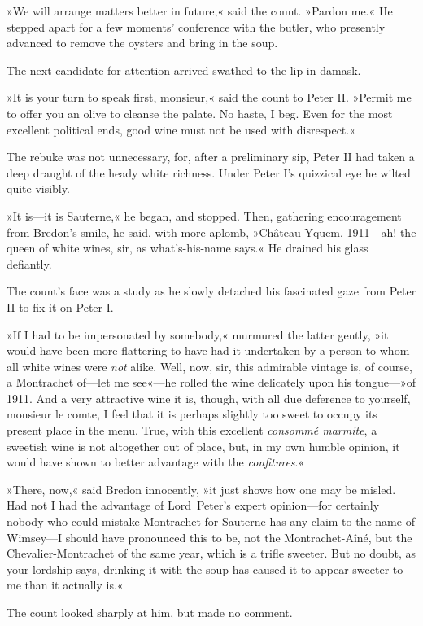 »We will arrange matters better in future,« said the count. »Pardon me.« He stepped apart for a few moments' conference with the butler, who presently advanced to remove the oysters and bring in the soup.

The next candidate for attention arrived swathed to the lip in damask.

»It is your turn to speak first, monsieur,« said the count to Peter II. »Permit me to offer you an olive to cleanse the palate. No haste, I beg. Even for the most excellent political ends, good wine must not be used with disrespect.«

The rebuke was not unnecessary, for, after a preliminary sip, Peter II had taken a deep draught of the heady white richness. Under Peter I's quizzical eye he wilted quite visibly.

»It is—it is Sauterne,« he began, and stopped. Then, gathering encouragement from Bredon's smile, he said, with more aplomb, »Château Yquem, 1911—ah! the queen of white wines, sir, as what's-his-name says.« He drained his glass defiantly.

The count's face was a study as he slowly detached his fascinated gaze from Peter II to fix it on Peter I.

»If I had to be impersonated by somebody,« murmured the latter gently, »it would have been more flattering to have had it undertaken by a person to whom all white wines were \textit{not} alike. Well, now, sir, this admirable vintage is, of course, a Montrachet of—let me see«—he rolled the wine delicately upon his tongue—»of 1911. And a very attractive wine it is, though, with all due deference to yourself, monsieur le comte, I feel that it is perhaps slightly too sweet to occupy its present place in the menu. True, with this excellent \textit{consommé marmite}, a sweetish wine is not altogether out of place, but, in my own humble opinion, it would have shown to better advantage with the \textit{confitures}.«

»There, now,« said Bredon innocently, »it just shows how one may be misled. Had not I had the advantage of Lord~Peter's expert opinion—for certainly nobody who could mistake Montrachet for Sauterne has any claim to the name of Wimsey—I should have pronounced this to be, not the Montrachet-Aîné, but the Chevalier-Montrachet of the same year, which is a trifle sweeter. But no doubt, as your lordship says, drinking it with the soup has caused it to appear sweeter to me than it actually is.«

The count looked sharply at him, but made no comment.

